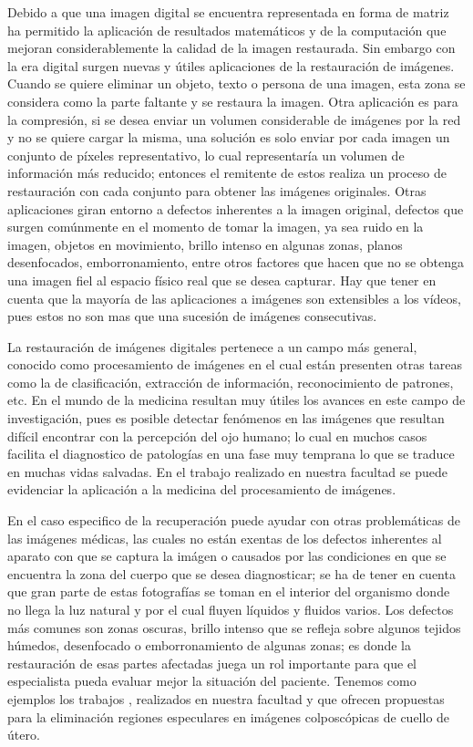 Debido a que una imagen digital se encuentra representada en forma de matriz ha permitido la aplicaci\'on de resultados matem\'aticos y de la computaci\'on que mejoran considerablemente la calidad de la imagen restaurada. Sin embargo con la era digital surgen nuevas y \'utiles aplicaciones de la restauraci\'on de im\'agenes. Cuando se quiere eliminar un objeto, texto o persona de una imagen, esta zona se considera como la parte faltante y se restaura la imagen. Otra aplicaci\'on es para la compresi\'on, si se desea enviar un volumen considerable de imágenes por la red y no se quiere cargar la misma, una solución es solo enviar por cada imagen un conjunto de p\'ixeles representativo, lo cual representaría un volumen de informaci\'on m\'as reducido; entonces el remitente de estos realiza un proceso de restauraci\'on con cada conjunto para obtener las imágenes originales. Otras aplicaciones giran entorno a defectos inherentes a la imagen original, defectos que surgen comúnmente en el momento de tomar la imagen, ya sea ruido en la imagen, objetos en movimiento, brillo intenso en algunas zonas, planos desenfocados, emborronamiento, entre otros factores que hacen que no se obtenga una imagen fiel al espacio físico real que se desea capturar. Hay que tener en cuenta que la mayor\'ia de las aplicaciones a im\'agenes son extensibles a los vídeos, pues estos no son mas que una sucesión de imágenes consecutivas.

La restauraci\'on de im\'agenes digitales pertenece a un campo m\'as general, conocido como procesamiento de im\'agenes en el cual est\'an presenten otras tareas como la de clasificaci\'on, extracci\'on de informaci\'on, reconocimiento de patrones, etc. En el mundo de la medicina resultan muy \'utiles los avances en este campo de investigaci\'on, pues es posible detectar fen\'omenos en las im\'agenes que resultan difícil encontrar con la percepción del ojo humano; lo cual en muchos casos facilita el diagnostico de patologías en una fase muy temprana lo que se traduce en muchas vidas salvadas. En el trabajo \cite{afals2016tesis} realizado en nuestra facultad se puede evidenciar la aplicaci\'on a la medicina del procesamiento de im\'agenes.

En el caso especifico de la recuperaci\'on puede ayudar con otras problemáticas de las im\'agenes m\'edicas, las cuales no est\'an exentas de los defectos inherentes al aparato con que se captura la im\'agen o causados por las condiciones en que se encuentra la zona del cuerpo que se desea diagnosticar; se ha de tener en cuenta que gran parte de estas fotograf\'ias se toman en el interior del organismo donde no llega la luz natural y por el cual fluyen l\'iquidos y fluidos varios. Los defectos m\'as comunes son zonas oscuras, brillo intenso que se refleja sobre algunos tejidos h\'umedos, desenfocado o emborronamiento de algunas zonas; es donde la restauraci\'on de esas partes afectadas juega un rol importante para que el especialista pueda evaluar mejor la situaci\'on del paciente. Tenemos como ejemplos los trabajos \cite{dgomez2018tesis,apalmer2015tesis}, realizados en nuestra facultad y que ofrecen propuestas para la eliminaci\'on regiones especulares en imágenes colposcópicas de cuello de útero.

